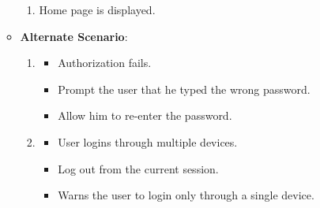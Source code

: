 \documentclass{report}
\begin{document}
\begin{tcolorbox}[colframe=white, colback=lightred, arc=8pt]
\begin{itemize}
\begin{itemize}
\begin{enumerate}
            \item Home page is displayed. 
        \end{enumerate}
       \item \textbf{Alternate Scenario}: 
       \begin{enumerate}
           \item 
           \begin{itemize} 
           \item Authorization fails.
            \item Prompt the user that he typed the wrong password.
            \item Allow him to re-enter the password.
           \end{itemize}
           \item 
           \begin{itemize}
           \item  User logins through multiple devices.
           \item Log out from the current session.
           \item Warns the user to login only through a single device.
           \end{itemize}
       \end{enumerate}
    \end{itemize}
\end{itemize}


\end{tcolorbox}
\end{document}
